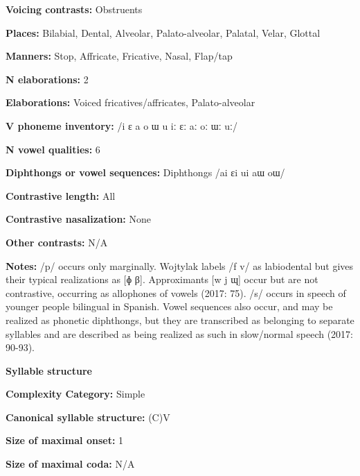 \textbf{Voicing contrasts:} Obstruents



\textbf{Places:} Bilabial, Dental, Alveolar, Palato-alveolar, Palatal, Velar, Glottal



\textbf{Manners:} Stop, Affricate, Fricative, Nasal, Flap/tap



\textbf{N elaborations:} 2



\textbf{Elaborations:} Voiced fricatives/affricates, Palato-alveolar



\textbf{V phoneme inventory:} /i ɛ a o ɯ u iː ɛː aː oː ɯː uː/



\textbf{N vowel qualities:} 6



\textbf{Diphthongs or vowel sequences:} Diphthongs /ai ɛi ui aɯ oɯ/



\textbf{Contrastive length:} All



\textbf{Contrastive nasalization:} None



\textbf{Other contrasts:} N/A



\textbf{Notes:} /p/ occurs only marginally. Wojtylak labels /f v/ as labiodental but gives their typical realizations as [ɸ β]. Approximants [w j ɰ] occur but are not contrastive, occurring as allophones of vowels (2017: 75). /s/ occurs in speech of younger people bilingual in Spanish. Vowel sequences also occur, and may be realized as phonetic diphthongs, but they are transcribed as belonging to separate syllables and are described as being realized as such in slow/normal speech (2017: 90-93).



\textbf{Syllable structure}



\textbf{Complexity Category:} Simple



\textbf{Canonical syllable structure:} (C)V \citep[93-95]{Wojtylak2017}



\textbf{Size of maximal onset:} 1



\textbf{Size of maximal coda:} N/A



